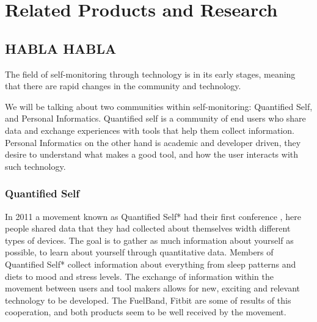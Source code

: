 \chapter{Related Products and Research} %

\label{Chapter3} %



\section{HABLA HABLA}
The field of self-monitoring through technology is in its early stages, meaning that there are rapid changes in the community and technology. %

We will be talking about two communities within self-monitoring: Quantified Self, and Personal Informatics. Quantified self is a community of end users who share data and exchange experiences with tools that help them collect information. Personal Informatics on the other hand is academic and developer driven, they desire to understand what makes a good tool, and how the user interacts with such technology.

\subsection{Quantified Self}
In 2011 a movement known as Quantified Self*\cite{quantifiedSelf} had their first conference \cite{bodyHackers}, here people shared data that they had collected about themselves width different types of devices. The goal is to gather as much information about yourself as possible, to learn about yourself through quantitative data. Members of Quantified Self* collect information about everything from sleep patterns and diets to mood and stress levels.
The exchange of information within the movement between users and tool makers %
 allows for new, exciting and relevant technology to be developed. The FuelBand\cite{fuelBand}, Fitbit\cite{fitBit} are some of results of this cooperation, and both products seem to be well received by the movement.
 
